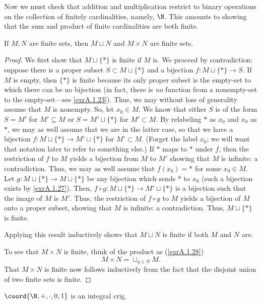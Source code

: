Now we must check that addition and multiplication restrict to binary operations on the collection of finitely cardinalities, namely, $\N$.  This amounts to showing that the sum and product of finite cardinalities are both finite.
\begin{prp}{}{}
If $M,N$ are finite sets, then $M\sqcup N$ and $M\times N$ are finite sets.
\begin{proof}
We first show that $M\sqcup \{ \ast \}$ is finite if $M$ is.  We proceed by contradiction:  suppose there is a proper subset $S\subset M\sqcup \{ \ast \}$ and a bijection $f\colon M\sqcup \{ \ast \} \rightarrow S$.  If $M$ is empty, then $\{ \ast \}$ is finite because its only proper subset is the empty-set to which there can be no bijection (in fact, there is \emph{no} function from a nonempty-set to the empty-set---see \cref{exrA.1.23}).  Thus, we may without loss of generality assume that $M$ is nonempty.  So, let $x_0\in M$.  We know that either $S$ is of the form $S=M'$ for $M'\subseteq M$ or $S=M'\sqcup \{ \ast \}$ for $M'\subset M$.  By relabeling $\ast$ as $x_0$ and $x_0$ as $\ast$, we may as well assume that we are in the latter case, so that we have a bijection $f\colon M\sqcup \{ \ast \} \rightarrow M'\sqcup \{ \ast \}$ for $M'\subset M$.  (Forget the label $x_0$; we will want that notation later to refer to something else.)  If $\ast$ maps to $\ast$ under $f$, then the restriction of $f$ to $M$ yields a bijection from $M$ to $M'$ showing that $M$ is infinite:  a contradiction.  Thus, we may as well assume that $f(x_0 )=\ast$ for some $x_0\in M$.  Let $g\colon M\sqcup \{ \ast \} \rightarrow M\sqcup \{ \ast \}$ be any bijection which sends $\ast$ to $x_0$ (such a bijection exists by \cref{exrA.1.27}).  Then, $f\circ g\colon M\sqcup \{ \ast \} \rightarrow M'\sqcup \{ \ast \}$ is a bijection such that the image of $M$ is $M'$.  Thus, the restriction of $f\circ g$ to $M$ yields a bijection of $M$ onto a proper subset, showing that $M$ is infinite:  a contradiction.  Thus, $M\sqcup \{ \ast \}$ is finite.

Applying this result inductively shows that $M\sqcup N$ is finite if both $M$ and $N$ are.

To see that $M\times N$ is finite, think of the product as (\cref{exrA.1.28})
\begin{equation}
M\times N=\sqcup _{y\in N}M.
\end{equation}
That $M\times N$ is finite now follows inductively from the fact that the disjoint union of two finite sets is finite.
\end{proof}
\end{prp}
\begin{crl}{}{}
$\coord{\N ,+,\cdot ,0,1}$ is an integral crig.
\end{crl}

